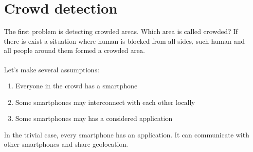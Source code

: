 \documentclass[12pt,a4paper]{report}
\begin{document}
\section*{Crowd detection}
The first problem is detecting crowded areas. Which area is called crowded? If there is exist a situation where human is blocked from all sides, such human and all people around them formed a crowded area.\\\\
Let's make several assumptions:
\begin{enumerate}
    \item Everyone in the crowd has a smartphone
    \item Some smartphones may interconnect with each other locally
    \item Some smartphones may has a considered application
\end{enumerate}
In the trivial case, every smartphone has an application. It can communicate with other smartphones and share geolocation.
\end{document}
